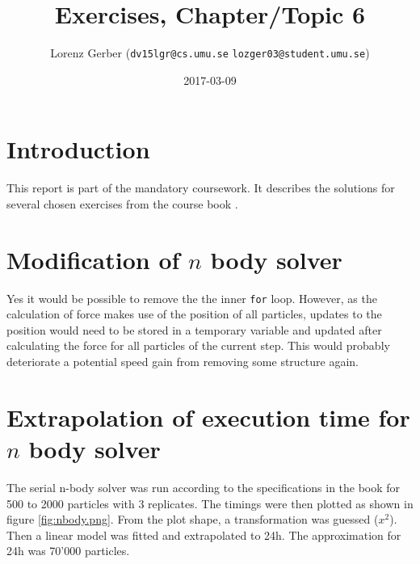\documentclass[a4paper,11pt,twoside]{article}
\title{Exercises, Chapter/Topic 6}
\author{Lorenz Gerber ({\tt{dv15lgr@cs.umu.se}} {\tt{lozger03@student.umu.se}})}
\date{2017-03-09}
\begin{document}
\lstset{language=C}
\maketitle
\thispagestyle{empty}
\newpage
\tableofcontents
\thispagestyle{empty}
\newpage

\clearpage
{}

\section{Introduction}
This report is part of the mandatory coursework. It describes the solutions for several chosen exercises from the course book \cite{pacheco2011}.

\section{Modification of $n$ body solver}
Yes it would be possible to remove the the inner \verb+for+ loop. However, as the calculation of force makes use of the position of all particles, updates to the position would need to be stored in a temporary variable and updated after calculating the force for all particles of the current step. This would probably deteriorate a potential speed gain from removing some structure again.

\section{Extrapolation of execution time for $n$ body solver}
The serial n-body solver was run according to the specifications in the book for 500 to 2000 particles with 3 replicates. The timings were then plotted as shown in figure \ref{fig:nbody.png}. From the plot shape, a transformation was guessed ($x^2$). Then a linear model was fitted and extrapolated to 24h. The approximation for 24h was 70'000 particles.
\end{document}

